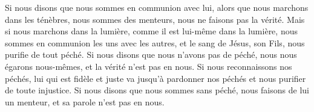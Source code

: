 Si nous disons que nous sommes en communion avec lui,
	alors que nous marchons dans les ténèbres,
	nous sommes des menteurs, nous ne faisons pas la vérité.
Mais si nous marchons dans la lumière,
	comme il est lui-même dans la lumière,
	nous sommes en communion les uns avec les autres,
	et le sang de Jésus, son Fils, nous purifie de tout péché.
Si nous disons que nous n’avons pas de péché,
	nous nous égarons nous-mêmes, et la vérité n’est pas en nous.
Si nous reconnaissons nos péchés,
	lui qui est fidèle et juste va jusqu’à pardonner nos péchés
	et nous purifier de toute injustice.
Si nous disons que nous sommes sans péché,
	nous faisons de lui un menteur, et sa parole n’est pas en nous.
